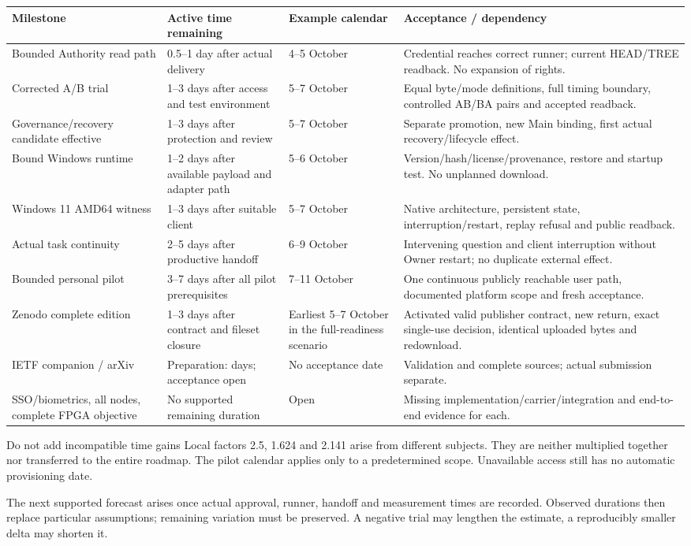 {\tighttable
\begin{tabularx}{\textwidth}{@{}L{35mm}L{26mm}L{29mm}>{\raggedright\arraybackslash}X@{}}\toprule
Milestone & Active time remaining & Example calendar & Acceptance / dependency\\\midrule
Bounded Authority read path & 0.5--1 day after actual delivery & 4--5 October & Credential reaches correct runner; current HEAD/TREE readback. No expansion of rights.\\
Corrected A/B trial & 1--3 days after access and test environment & 5--7 October & Equal byte/mode definitions, full timing boundary, controlled AB/BA pairs and accepted readback.\\
Governance/recovery candidate effective & 1--3 days after protection and review & 5--7 October & Separate promotion, new Main binding, first actual recovery/lifecycle effect.\\
Bound Windows runtime & 1--2 days after available payload and adapter path & 5--6 October & Version/hash/license/provenance, restore and startup test. No unplanned download.\\
Windows 11 AMD64 witness & 1--3 days after suitable client & 5--7 October & Native architecture, persistent state, interruption/restart, replay refusal and public readback.\\
Actual task continuity & 2--5 days after productive handoff & 6--9 October & Intervening question and client interruption without Owner restart; no duplicate external effect.\\
Bounded personal pilot & 3--7 days after all pilot prerequisites & 7--11 October & One continuous publicly reachable user path, documented platform scope and fresh acceptance.\\
Zenodo complete edition & 1--3 days after contract and fileset closure & Earliest 5--7 October in the full-readiness scenario & Activated valid publisher contract, new return, exact single-use decision, identical uploaded bytes and redownload.\\
IETF companion / arXiv & Preparation: days; acceptance open & No acceptance date & Validation and complete sources; actual submission separate.\\
SSO/biometrics, all nodes, complete FPGA objective & No supported remaining duration & Open & Missing implementation/carrier/integration and end-to-end evidence for each.\\\bottomrule
\end{tabularx}}
\vspace{5mm}
\begin{boundary}{Do not add incompatible time gains}
Local factors 2.5, 1.624 and 2.141 arise from different subjects. They are neither multiplied together nor transferred to the entire roadmap. The pilot calendar applies only to a predetermined scope. Unavailable access still has no automatic provisioning date.
\end{boundary}
\vspace{3mm}
The next supported forecast arises once actual approval, runner, handoff and measurement times are recorded. Observed durations then replace particular assumptions; remaining variation must be preserved. A negative trial may lengthen the estimate, a reproducibly smaller delta may shorten it.

